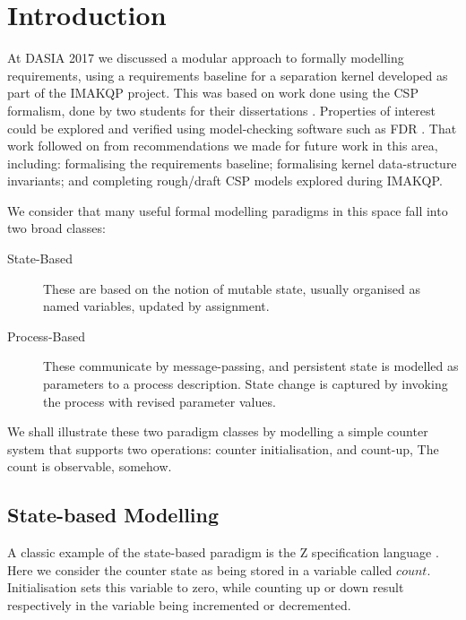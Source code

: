 
\section{Introduction}

At DASIA 2017\cite{Lero-DASIA17}
we discussed a modular approach to formally modelling
requirements, using a requirements baseline for a separation kernel developed
as part of the IMAKQP project\cite{IMAKQP-D02}.
This was based on work done using the CSP formalism\cite{hoare-1985:commuseque:},
done by two students for their dissertations \cite{KH-MCS2016,Costelloe17}.
Properties of interest could be explored and verified using
model-checking software such as FDR \cite{FDR3}.
That work followed on from recommendations we made for future work
in this area, including:
formalising the requirements baseline;
formalising kernel data-structure invariants;
and completing rough/draft CSP models explored during IMAKQP.

We consider that many useful formal modelling paradigms in this space
fall into two broad classes:
\begin{description}
  \item [State-Based]
    These are based on the notion of mutable state,
    usually organised as named variables, updated by assignment.
  \item [Process-Based]
    These communicate by message-passing, and persistent state
    is modelled as parameters to a process description.
    State change is captured by invoking the process with revised parameter values.
\end{description}
We shall illustrate these two paradigm classes by modelling a simple counter
system that supports two operations: counter initialisation, and count-up,
The count is observable, somehow.

\subsection{State-based Modelling}

A classic example of the state-based paradigm is
the Z specification language \cite{UsingZ}.
Here we consider the counter state as being stored
in a variable called $count$. Initialisation sets this variable to zero,
while counting up or down result respectively
in the variable being incremented or decremented.


